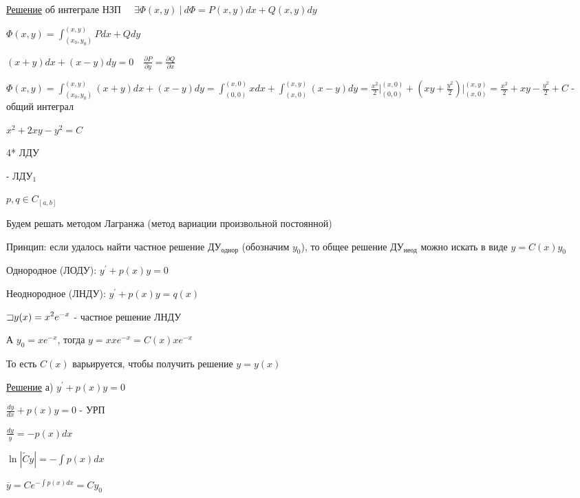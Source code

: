 \documentclass[12pt]{article}
\begin{document}
    \vspace{5mm}

    \underline{Решение} \Mems \Ths об интеграле НЗП $\quad \exists \Phi(x, y)\ | \ d\Phi = P(x, y)dx + Q(x, y)dy$

    $\displaystyle \Phi(x, y) = \int^{(x,y)}_{(x_0,y_0)} Pdx + Qdy$

    \Ex $\displaystyle (x + y)dx + (x - y)dy = 0 \quad \frac{\partial P}{\partial y} = \frac{\partial Q}{\partial x}$

    $\displaystyle \Phi(x, y) = \int^{(x, y)}_{(x_0,y_0)} (x + y)dx + (x - y)dy =
    \int^{(x,0)}_{(0,0)} xdx + \int^{(x,y)}_{(x,0)} (x - y)dy = \frac{x^2}{2} \Big|_{(0, 0)}^{(x, 0)} +
    (xy + \frac{y^2}{2}) \Big|_{(x, 0)}^{(x, y)} = \frac{x^2}{2} + xy - \frac{y^2}{2} + C$ - общий интеграл

    $\displaystyle x^2 + 2xy - y^2 = C$

    4* ЛДУ

    \Def {} - ЛДУ$\displaystyle _1$

    $\displaystyle p, q \in C_{[a, b]}$

    \Nota Будем решать методом Лагранжа (метод вариации произвольной постоянной)

    Принцип: если удалось найти частное решение ДУ$\displaystyle _\text{однор}$ (обозначим $\displaystyle y_0$), то общее решение ДУ$\displaystyle _\text{неод}$
    можно искать в виде $\displaystyle y = C(x)y_0$

    \Def Однородное (ЛОДУ): $\displaystyle y^\prime + p(x)y = 0$

    \Def Неоднородное (ЛНДУ): $\displaystyle y^\prime + p(x)y = q(x)$

    \Ex $\displaystyle \mathord{\sqsupset} y(x) = x^2 e^{-x}$ - частное решение ЛНДУ

    А $\displaystyle y_0 = x e^{-x}$, тогда $\displaystyle y = x xe^{-x} = C(x) x e^{-x}$

    То есть $C(x)$ варьируется, чтобы получить решение $y = y(x)$

    \underline{Решение} а) $\displaystyle y^\prime + p(x)y = 0$

    $\displaystyle \frac{dy}{dx} + p(x)y = 0$ - УРП

    $\displaystyle \frac{dy}{y} = -p(x)dx$

    $\displaystyle \ln|\tilde{C}y| = -\int p(x)dx$

    $\displaystyle \overline{y} = Ce^{-\int p(x) dx} = Cy_0$
\end{document}
